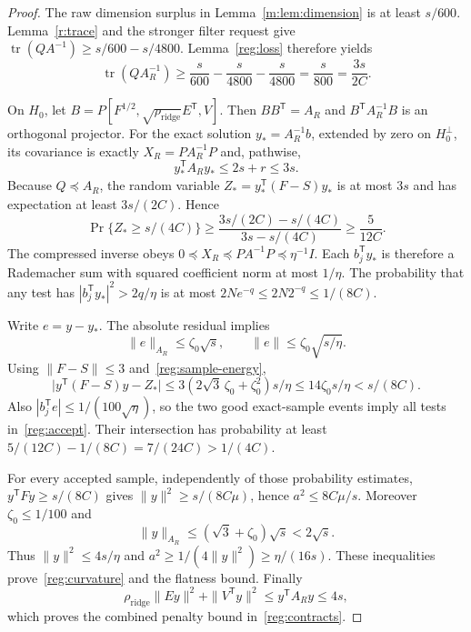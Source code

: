 \documentclass[11pt]{amsart}
\theoremstyle{definition}\newtheorem{definition}[theorem]{Definition}
\theoremstyle{remark}\newtheorem{remark}[theorem]{Remark}
\numberwithin{equation}{section}
\begin{document}
\begin{proof}
The raw dimension surplus in Lemma~\ref{m:lem:dimension} is at least
$s/600$.  Lemma~\ref{r:trace} and the stronger filter request give
$\operatorname{tr}(QA^{-1})\ge s/600-s/4800$.
Lemma~\ref{reg:loss} therefore yields
\begin{equation}\label{reg:trace-margin}
 \operatorname{tr}(QA_R^{-1})\ge
 \frac{s}{600}-\frac{s}{4800}-\frac{s}{4800}
 =\frac{s}{800}=\frac{3s}{2C}.
\end{equation}

On $H_0$, let
$B=P[F^{1/2},\sqrt{\rho_{\mathrm{ridge}}}E^{\mathsf T},V]$.
Then $BB^{\mathsf T}=A_R$ and $B^{\mathsf T}A_R^{-1}B$ is an orthogonal
projector.  For the exact solution $y_*=A_R^{-1}b$, extended by zero on
$H_0^\perp$, its covariance is exactly $X_R=PA_R^{-1}P$ and, pathwise,
\begin{equation}\label{reg:sample-energy}
 y_*^{\mathsf T}A_Ry_*\le2s+r\le3s.
\end{equation}
Because $Q\preceq A_R$, the random variable
$Z_*=y_*^{\mathsf T}(F-S)y_*$ is at most $3s$ and has expectation at least
$3s/(2C)$.  Hence
\[
 \Pr\{Z_*\ge s/(4C)\}
 \ge\frac{3s/(2C)-s/(4C)}{3s-s/(4C)}
 \ge\frac5{12C}.
\]
The compressed inverse obeys
$0\preceq X_R\preceq PA^{-1}P\preceq\eta^{-1}I$.
Each $b_j^{\mathsf T}y_*$ is therefore a Rademacher sum with squared
coefficient norm at most $1/\eta$.  The probability that any test has
$|b_j^{\mathsf T}y_*|^2>2q/\eta$ is at most
$2Ne^{-q}\le2N2^{-q}\le1/(8C)$.

Write $e=y-y_*$.  The absolute residual implies
\[
 \|e\|_{A_R}\le\zeta_0\sqrt s,
 \qquad \|e\|\le\zeta_0\sqrt{s/\eta}.
\]
Using $\|F-S\|\le3$ and~\eqref{reg:sample-energy},
\[
 \bigl|y^{\mathsf T}(F-S)y-Z_*\bigr|
 \le3(2\sqrt3\,\zeta_0+\zeta_0^2)s/\eta
 \le14\zeta_0s/\eta<s/(8C).
\]
Also $|b_j^{\mathsf T}e|\le1/(100\sqrt\eta)$, so the two good
exact-sample events imply all tests in~\eqref{reg:accept}.
Their intersection has probability at least
$5/(12C)-1/(8C)=7/(24C)>1/(4C)$.

For every accepted sample, independently of those probability estimates,
$y^{\mathsf T}Fy\ge s/(8C)$ gives
$\|y\|^2\ge s/(8C\mu)$, hence $a^2\le8C\mu/s$.
Moreover $\zeta_0\le1/100$ and
\[
 \|y\|_{A_R}\le(\sqrt3+\zeta_0)\sqrt s<2\sqrt s.
\]
Thus $\|y\|^2\le4s/\eta$ and
$a^2\ge1/(4\|y\|^2)\ge\eta/(16s)$.
These inequalities prove~\eqref{reg:curvature} and the flatness bound.
Finally
\[
 \rho_{\mathrm{ridge}}\|Ey\|^2+\|V^{\mathsf T}y\|^2
 \le y^{\mathsf T}A_Ry\le4s,
\]
which proves the combined penalty bound in~\eqref{reg:contracts}.


\end{proof}
\end{document}
